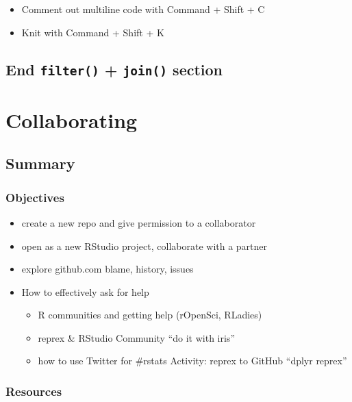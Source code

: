 \documentclass[]{book}
\providecommand{\tightlist}{%
  \setlength{\itemsep}{0pt}\setlength{\parskip}{0pt}}
\begin{document}
\begin{itemize}
\tightlist
\item
  Comment out multiline code with Command + Shift + C
\item
  Knit with Command + Shift + K
\end{itemize}

\hypertarget{end-filter-join-section}{%
\section{\texorpdfstring{End \texttt{filter()} + \texttt{join()} section}{End filter() + join() section}}\label{end-filter-join-section}}

\hypertarget{collaborating}{%
\chapter{Collaborating}\label{collaborating}}

\hypertarget{summary-6}{%
\section{Summary}\label{summary-6}}

\hypertarget{objectives-6}{%
\subsection{Objectives}\label{objectives-6}}

\begin{itemize}
\tightlist
\item
  create a new repo and give permission to a collaborator
\item
  open as a new RStudio project, collaborate with a partner
\item
  explore github.com blame, history, issues
\item
  How to effectively ask for help

  \begin{itemize}
  \tightlist
  \item
    R communities and getting help (rOpenSci, RLadies)
  \item
    reprex \& RStudio Community ``do it with iris''
  \item
    how to use Twitter for \#rstats
    Activity: reprex to GitHub ``dplyr reprex''
  \end{itemize}
\end{itemize}

\hypertarget{resources-7}{%
\subsection{Resources}\label{resources-7}}
\end{document}
